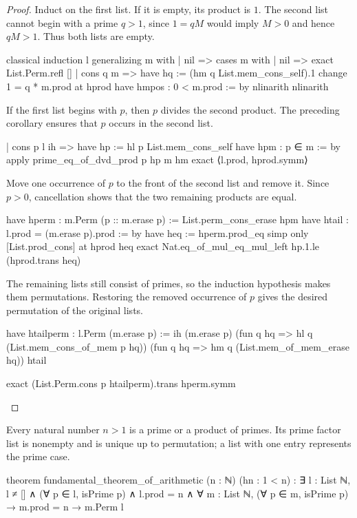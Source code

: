 \begin{proof}
  Induct on the first list.
  If it is empty, its product is $1$.
  The second list cannot begin with a prime $q>1$, since $1=qM$ would imply $M>0$ and hence $qM>1$.
  Thus both lists are empty.

  \begin{lean}
    classical
    induction l generalizing m with
    | nil =>
      cases m with
      | nil => exact List.Perm.refl []
      | cons q m =>
        have hq := (hm q List.mem_cons_self).1
        change 1 = q * m.prod at hprod
        have hmpos : 0 < m.prod := by
          nlinarith
        nlinarith
  \end{lean}

  If the first list begins with $p$, then $p$ divides the second product.
  The preceding corollary ensures that $p$ occurs in the second list.

  \begin{lean}
    | cons p l ih =>
      have hp := hl p List.mem_cons_self
      have hpm : p ∈ m := by
        apply prime_eq_of_dvd_prod p hp m hm
        exact ⟨l.prod, hprod.symm⟩
  \end{lean}

  Move one occurrence of $p$ to the front of the second list and remove it.
  Since $p>0$, cancellation shows that the two remaining products are equal.

  \begin{lean}
    have hperm : m.Perm (p :: m.erase p) := List.perm_cons_erase hpm
    have htail : l.prod = (m.erase p).prod := by
      have heq := hperm.prod_eq
      simp only [List.prod_cons] at hprod heq
      exact Nat.eq_of_mul_eq_mul_left hp.1.le (hprod.trans heq)
  \end{lean}

  The remaining lists still consist of primes, so the induction hypothesis makes them
  permutations.
  Restoring the removed occurrence of $p$ gives the desired permutation of the original lists.

  \begin{lean}
    have htailperm : l.Perm (m.erase p) := ih (m.erase p)
      (fun q hq => hl q (List.mem_cons_of_mem p hq))
      (fun q hq => hm q (List.mem_of_mem_erase hq)) htail

    exact (List.Perm.cons p htailperm).trans hperm.symm
  \end{lean}

\end{proof}

\begin{theorem}
  \label{ent:thm:fundamental-theorem-arithmetic}
  Every natural number $n>1$ is a prime or a product of primes.
  Its prime factor list is nonempty and is unique up to permutation; a list with one entry
  represents the prime case.

  \begin{lean}
    theorem fundamental_theorem_of_arithmetic (n : ℕ) (hn : 1 < n) :
        ∃ l : List ℕ, l ≠ [] ∧ (∀ p ∈ l, isPrime p) ∧ l.prod = n ∧
          ∀ m : List ℕ, (∀ p ∈ m, isPrime p) → m.prod = n → m.Perm l
  \end{lean}
\end{theorem}

